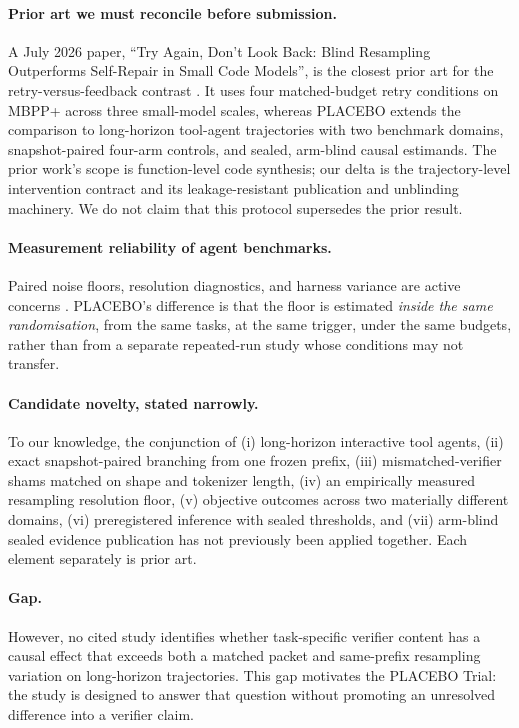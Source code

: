 \documentclass{article}
\begin{document}
\paragraph{Prior art we must reconcile before submission.}
A July 2026 paper, ``Try Again, Don't Look Back: Blind Resampling Outperforms
Self-Repair in Small Code Models'', is the closest prior art for the
retry-versus-feedback contrast \cite{try_again_dont_look_back_2026}. It uses
four matched-budget retry conditions on MBPP+ across three small-model scales,
whereas PLACEBO extends the comparison to long-horizon tool-agent trajectories
with two benchmark domains, snapshot-paired four-arm controls, and sealed,
arm-blind causal estimands. The prior work's scope is function-level code
synthesis; our delta is the trajectory-level intervention contract and its
leakage-resistant publication and unblinding machinery. We do not claim that
this protocol supersedes the prior result.

\paragraph{Measurement reliability of agent benchmarks.}
Paired noise floors, resolution diagnostics, and harness variance are active
concerns
\cite{kotawala_resolutiondiagnostics_2026,bowyer_dontusetheclt_2025,siska_robustness_2024,kaliyev_noisefloor_2026}.
PLACEBO's difference is that the floor is estimated \emph{inside the same
randomisation}, from the same tasks, at the same trigger, under the same
budgets, rather than from a separate repeated-run study whose conditions may not
transfer.

\paragraph{Candidate novelty, stated narrowly.}
To our knowledge, the conjunction of (i) long-horizon interactive tool agents,
(ii) exact snapshot-paired branching from one frozen prefix, (iii)
mismatched-verifier shams matched on shape and tokenizer length, (iv) an
empirically measured resampling resolution floor, (v) objective outcomes across
two materially different domains, (vi) preregistered inference with sealed
thresholds, and (vii) arm-blind sealed evidence publication has not previously
been applied together. Each element separately is prior art.

\paragraph{Gap.}
However, no cited study identifies whether task-specific verifier content has a
causal effect that exceeds both a matched packet and same-prefix resampling
variation on long-horizon trajectories. This gap motivates the PLACEBO Trial:
the study is designed to answer that question without promoting an unresolved
difference into a verifier claim.
\end{document}
